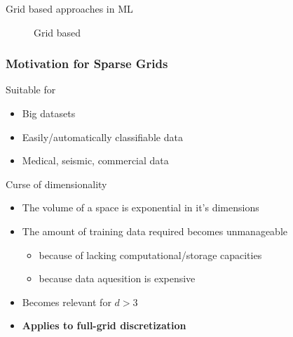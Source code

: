 \begin{frame}
\begin{block}{Grid based approaches in ML}
\begin{figure}[!htb]
      \vspace{-12px}
      \caption{Grid based}
      \endminipage
    \end{figure}
  \end{block}
\end{frame}

\begin{frame}
  \frametitle{Motivation for Sparse Grids}
  \topline
  \vspace{-10px}
  \begin{block}{Suitable for}
    \begin{itemize}
      \item Big datasets
      \item Easily/automatically classifiable data
      \item Medical, seismic, commercial data
    \end{itemize}
  \end{block}
  \begin{block}{Curse of dimensionality}
    \begin{itemize}
    \item The volume of a space is exponential in it's dimensions
    \item The amount of training data required becomes unmanageable
      \begin{itemize}
      \item because of lacking computational/storage capacities
      \item because data aquesition is expensive
      \end{itemize}
    \item Becomes relevant for $d > 3$
    \item \textbf{Applies to full-grid discretization}
    \end{itemize}
  \end{block}
\end{frame}

